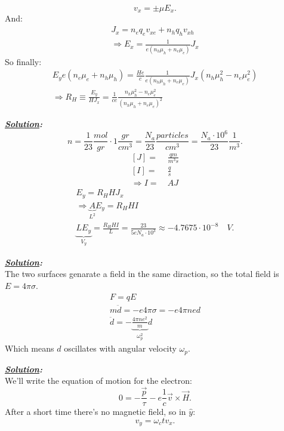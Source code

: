 \documentclass[notitlepage]{report}
\begin{document}
\begin{question}[title = Question 1]{}{}
\[
	v_x=\pm\mu E_x
.\] 
And:\\
\begin{gather*}
	J_x=n_eq_ev_{xe}+n_hq_hv_{xh}\\
\Rightarrow E_x=\frac{1}{e\left(n_h\mu_h+n_e\mu_e\right) }J_x	
\end{gather*}
So finally:\\
\begin{gather*}
E_ye\left(n_e\mu_e+n_h\mu_h\right)=\frac{He}{c}\frac{1}{e\left(n_h\mu_h+n_e\mu_e\right)}J_x\left(n_h\mu_h^2-n_e\mu_e^2\right)\\
\Rightarrow R_H\equiv \frac{E_y}{HJ_x}=\frac{1}{ce} \frac{n_h\mu_h^2-n_e\mu_e^2}{\left(n_h\mu_h+n_e\mu_e\right)^2 }
\end{gather*}
\end{question}
\begin{question}[title = Question 2]{}{}
\textbf{\emph{\underline{Solution}:}}\\
\[
	n=\frac{1}{23}\frac{mol}{gr}\cdot 1 \frac{gr}{cm^3}=\frac{N_a}{23}\frac{particles}{cm^3}=\frac{N_a\cdot10^{6}}{23} \frac{1}{m^3}
.\] 
\begin{align*}
	\left[J\right] =&\ \frac{qm}{m^3s} \\
	\left[I\right] =&\ \frac{q}{s} \\
	\Rightarrow I =&\ AJ
\end{align*}
\begin{gather*}
E_y = R_HHJ_x\\
\Rightarrow \underbrace{A}_{L^2}E_y = R_HHI\\
\underbrace{LE_y}_{V_y} = \frac{R_HHI}{L}=\frac{23}{5eN_a\cdot10^{3}}\approx \boxed{-4.7675\cdot 10 ^{-8}\quad V}
.\end{gather*}
\end{question}
\newpage
\begin{question}[title = Question 3]{}{}
\textbf{\emph{\underline{Solution}:}}\\
The two surfaces genarate a field in the same diraction, so the total field is $E=4\pi\sigma$.\\
\begin{gather*}
	F=qE\\
	m\ddot{d}=-e 4\pi\sigma=-e 4\pi ned\\
	\ddot{d}=- \underbrace{\frac{4\pi ne^2}{m}}_{\omega_p^2}d
\end{gather*}
Which means $d$ oscillates with angular velocity $\omega_p$.
\end{question}
\begin{question}[title = Question 4.1]{}{}
\textbf{\emph{\underline{Solution}:}}\\
We'll write the equation of motion for the electron:\\
\[
	0=-\frac{\vec{p}}{\tau}-e\frac{1}{c}\vec{v}\times \vec{H} 
.\] 
After a short time there's no magnetic field, so in $\hat{y}$:\\
\[
	v_y=\omega_c t v_x
.\] 

\end{question}
\end{document}
